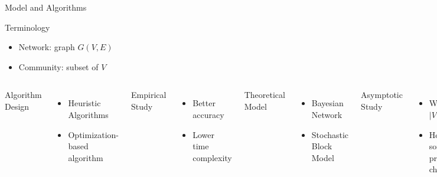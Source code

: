 \documentclass[notheorems]{beamer}
\begin{document}
\begin{frame}{Model and Algorithms}
	\begin{block}{Terminology}
		\begin{itemize}
			\item Network: graph $G(V, E)$
			\item Community: subset of $V$
		\end{itemize}		
	\end{block}
	\vskip 0.5cm
	\begin{columns}
		Algorithm Design
		\begin{itemize}
			\item Heuristic Algorithms
			\item Optimization-based algorithm
		\end{itemize}
		Empirical Study
		\begin{itemize}
			\item Better accuracy
			\item Lower time complexity
		\end{itemize}
		Theoretical Model
		\begin{itemize}
			\item Bayesian Network
			\item Stochastic Block Model
		\end{itemize}
		Asymptotic Study
		\begin{itemize}
			\item When $|V|\to \infty$
			\item How some property changes
		\end{itemize}
	\end{columns}
\end{frame}
\end{document}
